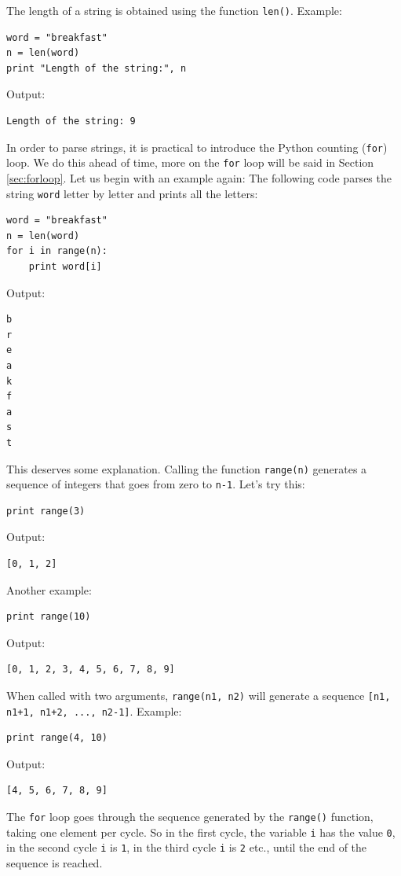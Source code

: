 The length of a string is obtained using the function {\tt len()}.
Example:

\begin{verbatim}
word = "breakfast"
n = len(word)
print "Length of the string:", n
\end{verbatim}
Output:

\begin{verbatim}
Length of the string: 9
\end{verbatim}
In order to parse strings, it is practical to introduce the Python counting 
({\tt for}) loop. We do this ahead of time, more on the {\tt for} loop will 
be said in Section \ref{sec:forloop}. Let us begin with an example again: The
following code parses the string {\tt word} letter by letter and prints all
the letters:

\begin{verbatim}
word = "breakfast"
n = len(word)
for i in range(n):
    print word[i]
\end{verbatim}
Output:

\begin{verbatim}
b
r
e
a
k
f
a
s
t
\end{verbatim}
This deserves some explanation. Calling the function {\tt range(n)} generates 
a sequence of integers that goes from zero to {\tt n-1}. Let's try this:

\begin{verbatim}
print range(3)
\end{verbatim}
Output:

\begin{verbatim}
[0, 1, 2]
\end{verbatim}
Another example:

\begin{verbatim}
print range(10)
\end{verbatim}
Output:

\begin{verbatim}
[0, 1, 2, 3, 4, 5, 6, 7, 8, 9]
\end{verbatim}
When called with two arguments, {\tt range(n1, n2)} will generate 
a sequence {\tt [n1, n1+1, n1+2, ..., n2-1]}. Example:

\begin{verbatim}
print range(4, 10)
\end{verbatim}
Output:

\begin{verbatim}
[4, 5, 6, 7, 8, 9]
\end{verbatim}
The {\tt for} loop goes through the sequence generated by the {\tt range()} function, 
taking one element per cycle. So in the first cycle, the variable {\tt i}
has the value {\tt 0}, in the second cycle {\tt i} is {\tt 1}, in the third cycle 
{\tt i} is {\tt 2} etc., until the end of the sequence is reached. 


